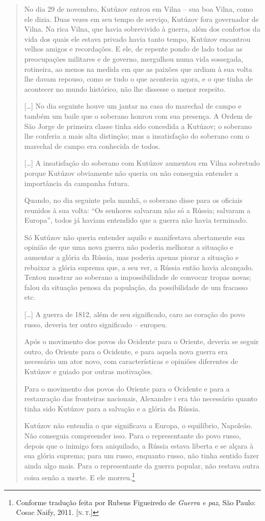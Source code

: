 \begin{quote}
No dia 29 de novembro, Kutúzov entrou em Vilna -- sua boa Vilna, como ele
dizia. Duas vezes em seu tempo de serviço, Kutúzov fora governador de
Vilna. Na rica Vilna, que havia sobrevivido à guerra, além dos confortos
da vida dos quais ele estava privado havia tanto tempo, Kutúzov
encontrou velhos amigos e recordações. E ele, de repente pondo de lado
todas as preocupações militares e de governo, mergulhou numa vida
sossegada, rotineira, ao menos na medida em que as paixões que ardiam à
sua volta lhe davam repouso, como se tudo o que acontecia agora, e o que
tinha de acontecer no mundo histórico, não lhe dissesse o menor
respeito.

[\ldots{}] No dia seguinte houve um jantar na casa do marechal de campo e
também um baile que o soberano honrou com sua presença. A Ordem de São
Jorge de primeira classe tinha sido concedida a Kutúzov; o soberano lhe
conferia a mais alta distinção; mas a insatisfação do soberano com o
marechal de campo era conhecida de todos.

[\ldots{}] A insatisfação do soberano com Kutúzov aumentou em Vilna sobretudo
porque Kutúzov obviamente não queria ou não conseguia entender a
importância da campanha futura.

Quando, no dia seguinte pela manhã, o soberano disse para os oficiais
reunidos à sua volta: ``Os senhores salvaram não só a Rússia; salvaram a
Europa'', todos já haviam entendido que a guerra não havia terminado.

Só Kutúzov não queria entender aquilo e manifestava abertamente sua
opinião de que uma nova guerra não poderia melhorar a situação e
aumentar a glória da Rússia, mas poderia apenas piorar a situação e
rebaixar a glória suprema que, a seu ver, a Rússia então havia
alcançado. Tentou mostrar ao soberano a impossibilidade de convocar
tropas novas; falou da situação penosa da população, da possibilidade de
um fracasso etc.

[\ldots{}] A guerra de 1812, além de seu significado, caro ao coração do povo
russo, deveria ter outro significado -- europeu.

Após o movimento dos povos do Ocidente para o Oriente, deveria se seguir
outro, do Oriente para o Ocidente, e para aquela nova guerra era
necessário um ator novo, com características e opiniões diferentes de
Kutúzov e guiado por outras motivações.

Para o movimento dos povos do Oriente para o Ocidente e para a
restauração das fronteiras nacionais, Alexandre \textsc{i} era tão necessário
quanto tinha sido Kutúzov para a salvação e a glória da Rússia.

Kutúzov não entendia o que significava a Europa, o equilíbrio, Napoleão.
Não conseguia compreender isso. Para o representante do povo russo,
depois que o inimigo fora aniquilado, a Rússia estava liberta e se
alçara à sua glória suprema; para um russo, enquanto russo, não tinha
sentido fazer ainda algo mais. Para o representante da guerra popular,
não restava outra coisa senão a morte. E ele morreu.\footnote{Conforme tradução feita por Rubens Figueiredo de \textit{Guerra e paz}, São Paulo: Cosac Naify, 2011. [\textsc{n.\,t.}]} 
\end{quote}

